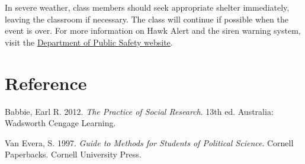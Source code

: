 \documentclass[11pt,]{article}
\theoremstyle{definition}
\theoremstyle{definition}
\theoremstyle{remark}
\begin{document}
In severe weather, class members should seek appropriate shelter
immediately, leaving the classroom if necessary. The class will continue
if possible when the event is over. For more information on Hawk Alert
and the siren warning system, visit the
\href{https://police.uiowa.edu/emergency-communications}{Department of
Public Safety website}.

\clearpage

\section*{Reference}\label{reference}

\hypertarget{refs}{}
\hypertarget{ref-Babbie2012}{}
Babbie, Earl R. 2012. \emph{The Practice of Social Research}. 13th ed.
Australia: Wadsworth Cengage Learning.

\hypertarget{ref-VanEvera1997}{}
Van Evera, S. 1997. \emph{Guide to Methods for Students of Political
Science}. Cornell Paperbacks. Cornell University Press.



\clearpage
\end{document}
